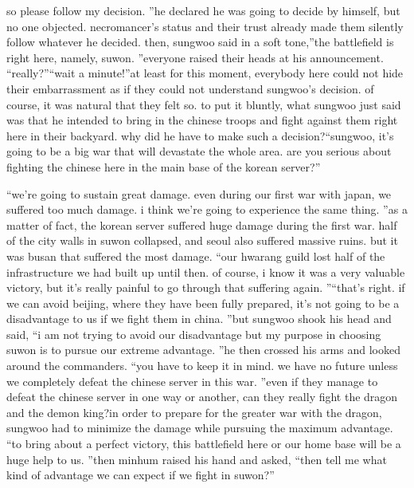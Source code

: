  so please follow my decision.
”he declared he was going to decide by himself, but no one objected.
necromancer’s status and their trust already made them silently follow whatever he decided.
then, sungwoo said in a soft tone,”the battlefield is right here, namely, suwon.
”everyone raised their heads at his announcement.
“really?”“wait a minute!”at least for this moment, everybody here could not hide their embarrassment as if they could not understand sungwoo’s decision.
of course, it was natural that they felt so.
 to put it bluntly, what sungwoo just said was that he intended to bring in the chinese troops and fight against them right here in their backyard.
 why did he have to make such a decision?“sungwoo, it’s going to be a big war that will devastate the whole area.
 are you serious about fighting the chinese here in the main base of the korean server?”

“we’re going to sustain great damage.
 even during our first war with japan, we suffered too much damage.
 i think we’re going to experience the same thing.
”as a matter of fact, the korean server suffered huge damage during the first war.
half of the city walls in suwon collapsed, and seoul also suffered massive ruins.
 but it was busan that suffered the most damage.
“our hwarang guild lost half of the infrastructure we had built up until then.
 of course, i know it was a very valuable victory, but it’s really painful to go through that suffering again.
”“that’s right.
 if we can avoid beijing, where they have been fully prepared, it’s not going to be a disadvantage to us if we fight them in china.
”but sungwoo shook his head and said, “i am not trying to avoid our disadvantage but my purpose in choosing suwon is to pursue our extreme advantage.
”he then crossed his arms and looked around the commanders.
“you have to keep it in mind.
 we have no future unless we completely defeat the chinese server in this war.
”even if they manage to defeat the chinese server in one way or another, can they really fight the dragon and the demon king?in order to prepare for the greater war with the dragon, sungwoo had to minimize the damage while pursuing the maximum advantage.
“to bring about a perfect victory, this battlefield here or our home base will be a huge help to us.
”then minhum raised his hand and asked, “then tell me what kind of advantage we can expect if we fight in suwon?”

 